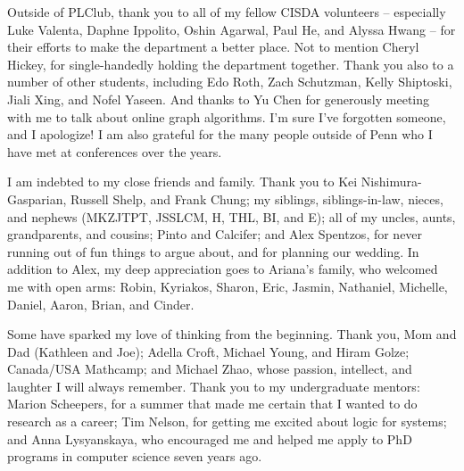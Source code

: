 Outside of PLClub, thank you to all of my fellow CISDA volunteers -- especially Luke Valenta, Daphne Ippolito, Oshin Agarwal, Paul He, and Alyssa Hwang -- for their efforts to make the department a better place.
Not to mention Cheryl Hickey, for single-handedly holding the department together.
Thank you also to a number of other students, including Edo Roth, Zach Schutzman, Kelly Shiptoski, Jiali Xing, and Nofel Yaseen.
And thanks to Yu Chen for generously meeting with me to talk about online graph algorithms.
I'm sure I've forgotten someone, and I apologize!
I am also grateful for the many people outside of Penn who I have met at conferences over the years.

I am indebted to my close friends and family. Thank you to Kei Nishimura-Gasparian, Russell Shelp, and Frank Chung; my siblings, siblings-in-law, nieces, and nephews (MKZJTPT, JSSLCM, H, THL, BI, and E); all of my uncles, aunts, grandparents, and cousins; Pinto and Calcifer; and Alex Spentzos, for never running out of fun things to argue about, and for planning our wedding. In addition to Alex, my deep appreciation goes to Ariana's family, who welcomed me with open arms: Robin, Kyriakos, Sharon, Eric, Jasmin, Nathaniel, Michelle, Daniel, Aaron, Brian, and Cinder.

Some have sparked my love of thinking from the beginning.
Thank you, Mom and Dad (Kathleen and Joe);
Adella Croft, Michael Young, and Hiram Golze;
Canada/USA Mathcamp;
and Michael Zhao,
whose passion, intellect, and laughter I will always remember.
Thank you to my undergraduate mentors: Marion Scheepers, for a summer that made me certain that I wanted to do research as a career;
Tim Nelson, for getting me excited about logic for systems;
and Anna Lysyanskaya, who encouraged me and helped me apply to PhD programs in computer science seven years ago.
